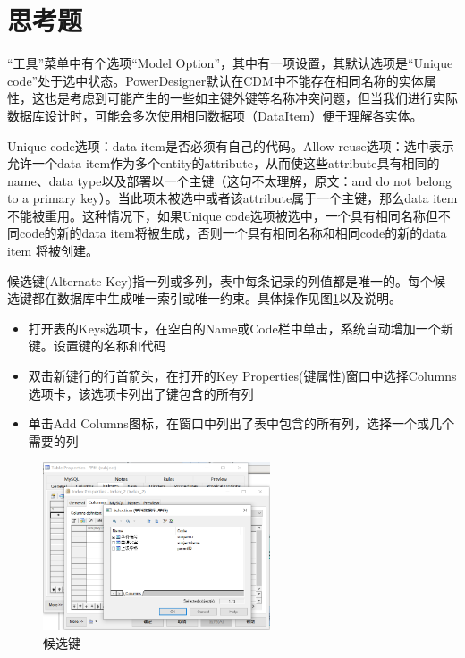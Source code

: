 \documentclass[11pt]{article}
\begin{document}
  \section{思考题}

  “工具”菜单中有个选项“Model Option”，其中有一项设置，其默认选项是“Unique code”处于选中状态。PowerDesigner默认在CDM中不能存在相同名称的实体属性，这也是考虑到可能产生的一些如主键外键等名称冲突问题，但当我们进行实际数据库设计时，可能会多次使用相同数据项（DataItem）便于理解各实体。
  
  Unique code选项：data item是否必须有自己的代码。Allow reuse选项：选中表示允许一个data item作为多个entity的attribute，从而使这些attribute具有相同的name、data type以及部署以一个主键（这句不太理解，原文：and do not belong to a primary key）。当此项未被选中或者该attribute属于一个主键，那么data item不能被重用。这种情况下，如果Unique code选项被选中，一个具有相同名称但不同code的新的data item将被生成，否则一个具有相同名称和相同code的新的data item 将被创建。


  候选键(Alternate Key)指一列或多列，表中每条记录的列值都是唯一的。每个候选键都在数据库中生成唯一索引或唯一约束。具体操作见图\ref{tab:AlternateKey}以及说明。
  \begin{itemize}
    \item[1.] 打开表的Keys选项卡，在空白的Name或Code栏中单击，系统自动增加一个新键。设置键的名称和代码
    \item[2.] 双击新键行的行首箭头，在打开的Key Properties(键属性)窗口中选择Columns选项卡，该选项卡列出了键包含的所有列
    \item[3.] 单击Add Columns图标，在窗口中列出了表中包含的所有列，选择一个或几个需要的列 
  \end{itemize}

  \begin{figure}[h]
    \centering
    \includegraphics[width=0.6\textwidth]{候选键.png}
    \caption{候选键}
    \label{tab:AlternateKey}
  \end{figure}
\end{document}
